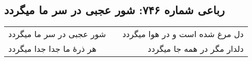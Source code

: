\begin{center}
\section*{رباعی شماره ۷۴۶: شور عجبی در سر ما میگردد}
\label{sec:0746}
\begin{longtable}{l p{0.5cm} r}
شور عجبی در سر ما میگردد
&&
دل مرغ شده است و در هوا میگردد
\\
هر ذرهٔ ما جدا جدا میگردد
&&
دلدار مگر در همه جا میگردد
\\
\end{longtable}
\end{center}
